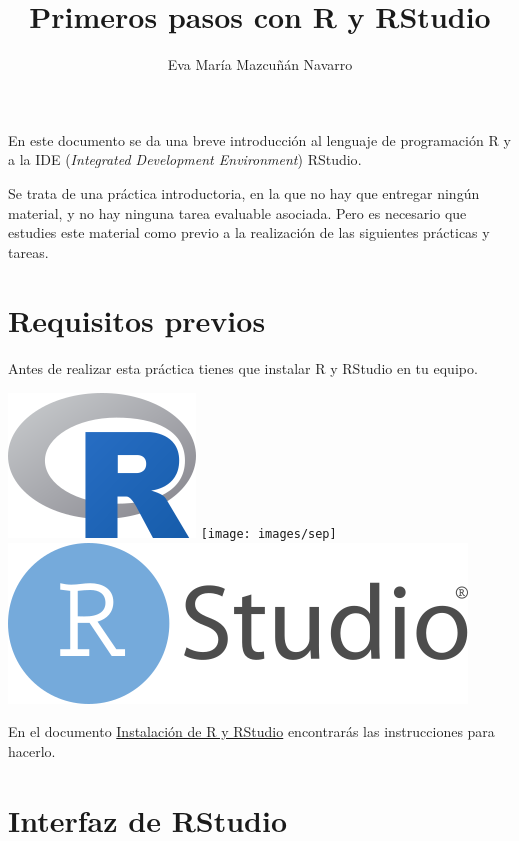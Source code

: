 \documentclass[
  title=normal,
  notoc,
  bib=normal]{mnye}
\title{Primeros pasos con R y RStudio}
\author{Eva María Mazcuñán Navarro}
\date{}
\begin{document}
\maketitle

%

{
\hypersetup{linkcolor=etoccolor}
\setcounter{tocdepth}{2}
\tableofcontents
}
\hypertarget{section}{%
\section*{}\label{section}}

En este documento se da una breve introducción al lenguaje de programación \textsf{R} y a la IDE (\textit{Integrated Development Environment}) \textsf{RStudio}.

Se trata de una práctica introductoria, en la que no hay que entregar ningún material, y no hay ninguna tarea evaluable asociada. Pero es necesario
que estudies este material como previo a la realización de las siguientes prácticas y tareas.

\hypertarget{prerequisites}{%
\section{Requisitos previos}\label{prerequisites}}

Antes de realizar esta práctica tienes que instalar \textsf{R} y \textsf{RStudio} en tu equipo.

\begin{center}\includegraphics[width=0.14\linewidth]{images/r-logo} \texttt{[image: images/sep]} \includegraphics[width=0.3\linewidth]{images/rstudio-logo} \end{center}

En el documento \href{https://emazcunan.github.io/install-r-rstudio}{Instalación de R y RStudio} encontrarás las instrucciones para hacerlo.

\hypertarget{rstudio}{%
\section{\texorpdfstring{Interfaz de \textsf{RStudio}}{Interfaz de }}\label{rstudio}}
\end{document}
